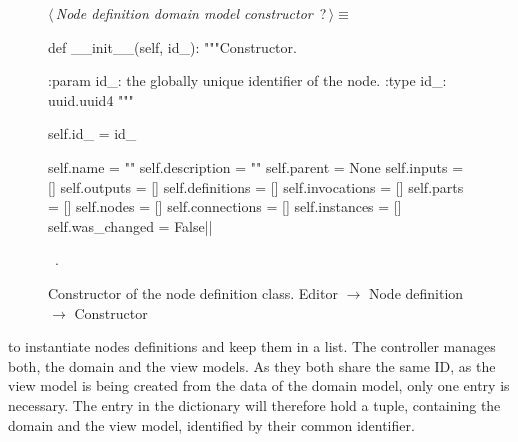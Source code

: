 \documentclass[%
    a4paper,    %
    justified,  %
    nobib,      %
    openany     %
]{tufte-book}
\begin{document}
\begin{figure}
\begin{flushleft} \small
\begin{minipage}{\linewidth}\label{scrap121}\raggedright\small
{} $\langle\,${\itshape Node definition domain model constructor}\nobreak\ {\footnotesize {?}}$\,\rangle\equiv$
\vspace{-1ex}
\begin{pythoncode}
def __init__(self, id_):
    """Constructor.

    :param id_: the globally unique identifier of the node.
    :type  id_: uuid.uuid4
    """

    self.id_         = id_

    self.name        = ""
    self.description = ""
    self.parent      = None
    self.inputs      = []
    self.outputs     = []
    self.definitions = []
    self.invocations = []
    self.parts       = []
    self.nodes       = []
    self.connections = []
    self.instances   = []
    self.was_changed = False|\NWsep|
\end{pythoncode}
\vspace{1.5ex}
\footnotesize
\begin{list}{}{\setlength{\itemsep}{-\parsep}\setlength{\itemindent}{-\leftmargin}}
\item \NWtxtMacroRefIn\ .

\item{}
\end{list}
\end{minipage}\vspace{4ex}
\end{flushleft}
\caption{Constructor of the node definition class.
  \newline{}\newline{}Editor $\rightarrow$ Node definition $\rightarrow$
  Constructor}
\label{editor:lst:node-definition:constructor}
\end{figure}

 to instantiate nodes definitions
and keep them in a list. The controller manages both, the domain and the view
models. As they both share the same ID, as the view model is being created from
the data of the domain model, only one entry is necessary. The entry in the
dictionary will therefore hold a tuple, containing the domain and the view
model, identified by their common identifier.
\end{document}
